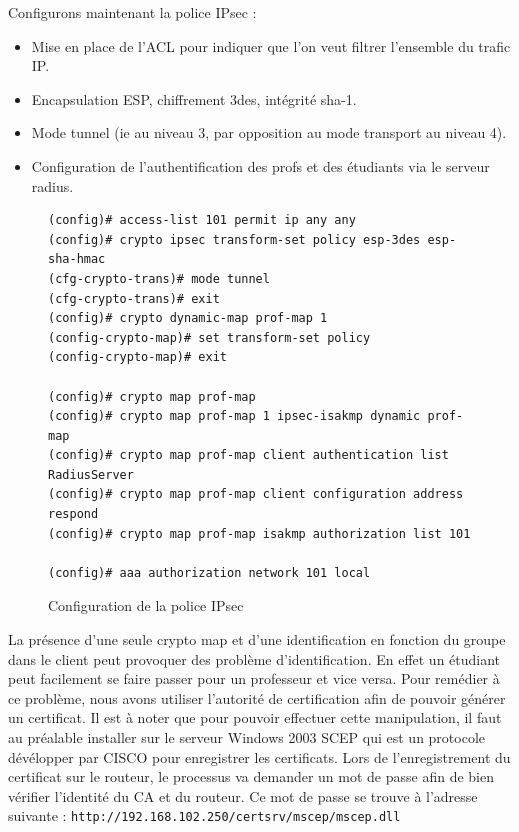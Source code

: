 Configurons maintenant la police IPsec :
\begin{itemize}
	\item Mise en place de l'ACL pour indiquer que l'on veut filtrer l'ensemble du trafic IP.
	\item Encapsulation ESP, chiffrement 3des, intégrité sha-1.
	\item Mode tunnel (ie au niveau 3, par opposition au mode transport au niveau 4).
	\item Configuration de l'authentification des profs et des étudiants via le serveur radius.
\end{itemize}

\begin{figure}[H]
	\begin{center}
		\begin{minipage}{1\textwidth}
			\begin{lstlisting}[frame=trBL]
(config)# access-list 101 permit ip any any
(config)# crypto ipsec transform-set policy esp-3des esp-sha-hmac
(cfg-crypto-trans)# mode tunnel
(cfg-crypto-trans)# exit
(config)# crypto dynamic-map prof-map 1
(config-crypto-map)# set transform-set policy
(config-crypto-map)# exit

(config)# crypto map prof-map
(config)# crypto map prof-map 1 ipsec-isakmp dynamic prof-map
(config)# crypto map prof-map client authentication list RadiusServer
(config)# crypto map prof-map client configuration address respond
(config)# crypto map prof-map isakmp authorization list 101

(config)# aaa authorization network 101 local
			\end{lstlisting}
		\end{minipage}
	\end{center}
	\caption{Configuration de la police IPsec}
	\label{configuration_police_ipsec}
\end{figure}

La présence d'une seule crypto map et d'une identification en fonction du groupe dans le client peut provoquer des problème d'identification. En effet un étudiant peut facilement se faire passer pour un professeur et vice versa.
Pour remédier à ce problème, nous avons utiliser l'autorité de certification afin de pouvoir générer un certificat. Il est à noter que pour pouvoir effectuer cette manipulation, il faut au préalable installer sur le serveur Windows 2003 SCEP qui est un protocole dévélopper par CISCO pour enregistrer les certificats.
Lors de l'enregistrement du certificat sur le routeur, le processus va demander un mot de passe afin de bien vérifier l'identité du CA et du routeur. Ce mot de passe se trouve à l'adresse suivante : \verb|http://192.168.102.250/certsrv/mscep/mscep.dll|

